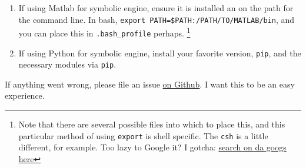 \begin{enumerate}
\begin{enumerate}
	\item For versions 1.8.x and before,
	\begin{enumerate}
		\item {\tt libtoolize}
		\item {\tt autoreconf -i} \quad if you know how to eliminate these steps by writing a bootstrap file which works on all systems, please contribute by way of a pull request.  PR's gladly acccepted to {\tt develop}.
		\item {\tt ./configure}
		\item {\tt make -j 4}
		\item {\tt sudo make install}
	\end{enumerate}

	\item For Bertini\_real 1.9 and later, using cmake:
	\begin{enumerate}
	  \item \verb|mkdir build && cd build|
	  \item \verb|cmake ../|
	  \item \verb|make -j 4|
	  \item \verb|make install| \\ Installing may require \verb|sudo|
	\end{enumerate}

	\item eat something delicious, and give thanks for this peaceful day
\end{enumerate}
\item[*]
If using Matlab for symbolic engine, ensure it is installed an on the path for the command line.  In bash, \verb|export PATH=$PATH:/PATH/TO/MATLAB/bin|, and you can place this in \verb|.bash_profile| perhaps.%
\footnote{Note that there are several possible files into which to place this, and this particular method of using {\tt export} is shell specific.  The {\tt csh} is a little different, for example.  Too lazy to Google it?  I gotcha: \href{https://www.google.com/\#q=add+to+path+linux&*}{search on da googs here} } 

\item[*]
If using Python for symbolic engine, install your favorite version, {\tt pip}, and the necessary modules via {\tt pip}.

\end{enumerate}


If anything went wrong, please file an issue \href{https://github.com/ofloveandhate/bertini_real/issues}{on Github}.  I want this to be an easy experience.
